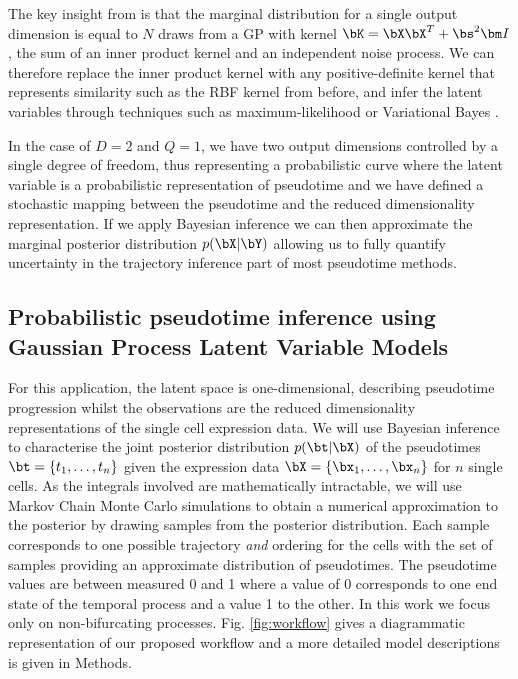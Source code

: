 The key insight from \cite{lawrence2005probabilistic} is that the marginal distribution for a single output dimension is equal to $N$ draws from a GP with kernel $\bK = \bX \bX^T + \bs^2 {\bm I}$, the sum of an inner product kernel and an independent noise process. We can therefore replace the inner product kernel with any positive-definite kernel that represents similarity such as the RBF kernel from before, and infer the latent variables through techniques such as maximum-likelihood \cite{lawrence2005probabilistic} or Variational Bayes \cite{titsias2009variational}.

In the case of $D = 2$ and $Q = 1$, we have two output dimensions controlled by a single degree of freedom, thus representing a probabilistic curve where the latent variable is a probabilistic representation of pseudotime and we have defined a stochastic mapping between the pseudotime and the reduced dimensionality representation. If we apply Bayesian inference we can then approximate the marginal posterior distribution $p(\bX | \bY)$ allowing us to fully quantify uncertainty in the trajectory inference part of most pseudotime methods.


\subsection{Probabilistic pseudotime inference using Gaussian Process Latent Variable Models}

For this application, the latent space is one-dimensional, describing pseudotime progression whilst the observations are the reduced dimensionality representations of the single cell expression data. We will use Bayesian inference to characterise the joint posterior distribution $p(\bt|\bX)$ of the pseudotimes $\bt = \{ t_1, \dots, t_n \}$ given the expression data $\bX = \{\bx_1, \dots, \bx_n \}$ for $n$ single cells. As the integrals involved are mathematically intractable, we will use Markov Chain Monte Carlo simulations to obtain a numerical approximation to the posterior by drawing samples from the posterior distribution. Each sample corresponds to one possible trajectory \emph{and} ordering for the cells with the set of samples providing an approximate distribution of pseudotimes. The pseudotime values are between measured 0 and 1 where a value of 0 corresponds to one end state of the temporal process and a value 1 to the other. In this work we focus only on non-bifurcating processes. Fig. \ref{fig:workflow} gives a diagrammatic representation of our proposed workflow and a more detailed model descriptions is given in Methods.

